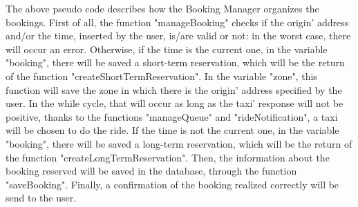 \vspace{0.5cm}

The above pseudo code describes how the Booking Manager organizes the bookings. 
First of all, the function "manageBooking" checks if the origin' address and/or the time, inserted by the user, is/are valid or not: in the worst case, there will occur an error. 
Otherwise, if the time is the current one, in the variable "booking", there will be saved a short-term reservation, which will be the return of the function "createShortTermReservation". In the variable "zone", this function will save the zone in which there is the origin' address specified by the user. 
In the while cycle, that will occur as long as the taxi' response will not be positive, thanks to the functions "manageQueue" and "rideNotification", a taxi will be chosen to do the ride. 
If the time is not the current one, in the variable "booking", there will be saved a long-term reservation, which will be the return of the function "createLongTermReservation".
Then, the information about the booking reserved will be saved in the database, through the function "saveBooking".
Finally, a confirmation of the booking realized correctly will be send to the user.